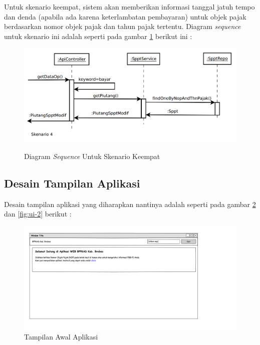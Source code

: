 \documentclass[pdftex,12pt, oneside]{article}
\begin{document}
Untuk skenario keempat, sistem akan memberikan informasi tanggal jatuh tempo dan denda (apabila ada karena keterlambatan pembayaran) untuk objek pajak berdasarkan nomor objek pajak dan tahun pajak tertentu. Diagram \textit{sequence} untuk skenario ini adalah seperti pada gambar \ref{fig:seq-dia-be-4} berikut ini :

\begin{figure}[H]
	\centering
	\includegraphics[width=1\textwidth]{./resources/seq-dia-4}
	\label{fig:seq-dia-be-4}
	\caption{Diagram \textit{Sequence} Untuk Skenario Keempat}
\end{figure}

\subsection{Desain Tampilan Aplikasi}

Desain tampilan aplikasi yang diharapkan nantinya adalah seperti pada gambar \ref{fig:ui-1} dan \ref{fig:ui-2} berikut :

\begin{figure}[H]
	\centering
	\includegraphics[width=1\textwidth]{./resources/main_page}
	\caption{Tampilan Awal Aplikasi}
	\label{fig:ui-1}
\end{figure}
\end{document}

